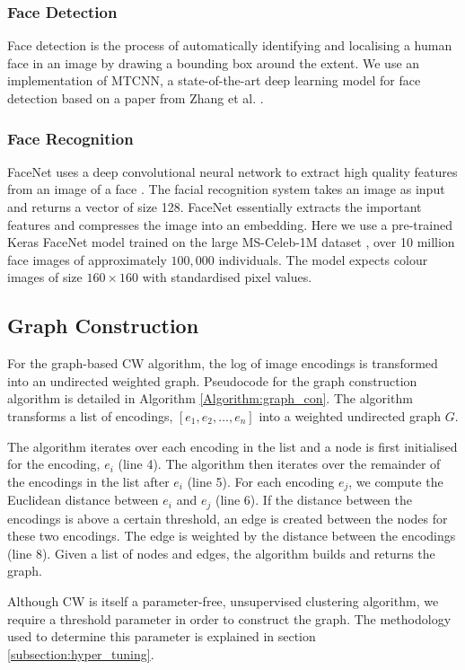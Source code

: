 \documentclass[a4paper,12pt]{report}
\begin{document}
\subsubsection{Face Detection}
Face detection is the process of automatically identifying and localising a human face in an image by drawing a bounding box around the extent. We use an implementation of MTCNN, a state-of-the-art deep learning model for face detection based on a paper from Zhang et al. \cite{DBLP:journals/corr/ZhangZL016}.

\subsubsection{Face Recognition}
FaceNet uses a deep convolutional neural network to extract high quality features from an image of a face \cite{schroff2015facenet}. The facial recognition system takes an image as input and returns a vector of size 128. FaceNet essentially extracts the important features and compresses the image into an embedding. Here we use a pre-trained Keras FaceNet model \cite{nyokimtl39:online} trained on the large MS-Celeb-1M dataset \cite{Guo2016MSCeleb1MAD}, over 10 million face images of approximately $100,000$ individuals. The model expects colour images of size $160 \times 160$ with standardised pixel values.

\subsection{Graph Construction}
For the graph-based CW algorithm, the log of image encodings is transformed into an undirected weighted graph. Pseudocode for the graph construction algorithm is detailed in Algorithm \ref{Algorithm:graph_con}. The algorithm transforms a list of encodings, $[e_1, e_2, ..., e_n]$ into a weighted undirected graph $G$. 

The algorithm iterates over each encoding in the list and a node is first initialised for the encoding, $e_i$ (line 4). The algorithm then iterates over the remainder of the encodings in the list after $e_i$ (line 5). For each encoding $e_j$, we compute the Euclidean distance between $e_i$ and $e_j$ (line 6). If the distance between the encodings is above a certain threshold, an edge is created between the nodes for these two encodings. The edge is weighted by the distance between the encodings (line 8). Given a list of nodes and edges, the algorithm builds and returns the graph. 

Although CW is itself a parameter-free, unsupervised clustering algorithm, we require a threshold parameter in order to construct the graph. The methodology used to determine this parameter is explained in section \ref{subsection:hyper_tuning}.
\end{document}
